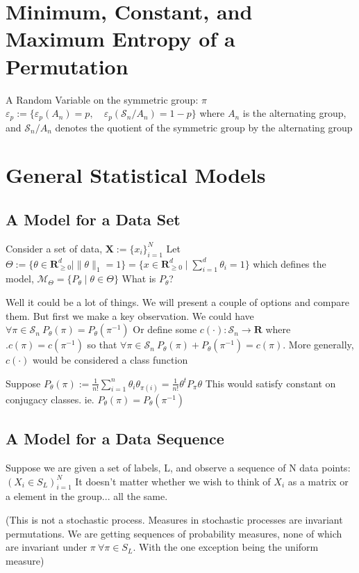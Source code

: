 \documentclass{article}
\theoremstyle{definition}
\begin{document}
\section{Minimum, Constant, and Maximum Entropy of a Permutation }
A Random Variable on the symmetric group:
$ \pi $ ~ $ \varepsilon_p := \{\varepsilon_p(A_n) =p, \quad \varepsilon_p(\mathcal{S}_n / A_n) = 1-p \} $ where $A_n$ is the alternating group, and $\mathcal{S}_n / A_n$ denotes the quotient of the symmetric group by the alternating group


\section{General Statistical Models}
\subsection{A Model for a Data Set}
Consider a set of data, \( \mathbf{X} := \{ x_i \}_{i=1}^N\)
Let \(
\Theta := \{ \theta \in \mathbf{R}_{\geq 0}^d \mid  \|\theta\|_1 = 1\} = \{x\in \mathbf{R}_{\geq 0}^d \mid \sum_{i=1}^d \theta_i = 1\} 
\) 
which defines the model, \(
\mathcal{M}_\Theta = \{ P_\theta \mid \theta \in \Theta \}
\)
What is $P_\theta$?

Well it could be a lot of things. We will present a couple of options and compare them. But first we make a key observation. 
We could have $ \forall \pi \in \mathcal{S}_n \: P_\theta(\pi) = P_\theta(\pi^{-1}) $
Or define some $c(\cdot):\mathcal{S}_n \rightarrow \mathbf{R} $ where $. c(\pi) = c(\pi^{-1}) $ so that $ \forall \pi \in \mathcal{S}_n \: P_\theta(\pi) + P_\theta(\pi^{-1})  = c( \pi ) $. More generally, $c(\cdot) $ would be considered a class function

Suppose \( P_\theta(\pi) := \frac{1}{n!}\sum_{i=1}^n \theta_i\theta_{\pi(i)} = \frac{1}{n!}\theta^t P_\pi\theta \) 
This would satisfy constant on conjugacy classes. ie. $ P_\theta(\pi) = P_\theta(\pi^{-1}) $

\subsection{A Model for a Data Sequence}
Suppose we are given a set of labels, L, and observe a sequence of N data points: $ (X_i \in S_L)_{i=1}^N$
It doesn't matter whether we wish to think of $X_i$ as a matrix or a element in the group... all the same.

(This is not a stochastic process. Measures in stochastic processes are invariant permutations. We are getting sequences of probability measures, none of which are invariant under $\pi \: \forall \pi \in S_L$. With the one exception being the uniform measure)
\end{document}
